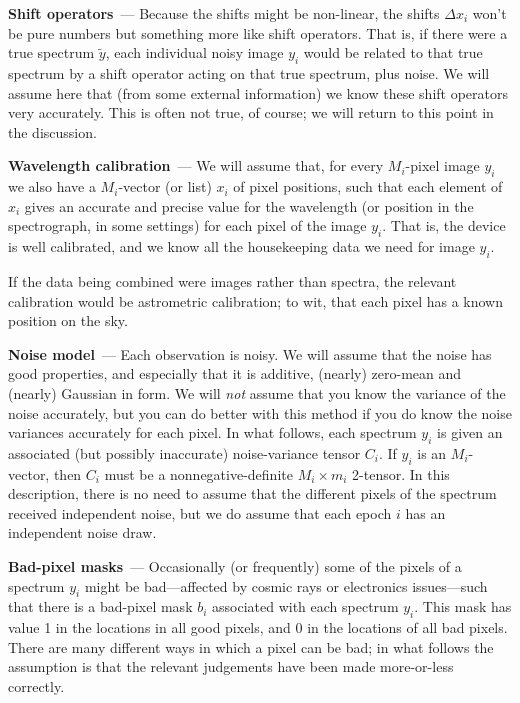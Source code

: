 \documentclass[modern]{aastex631}
\renewcommand{\paragraph}[1]{\medskip\par\noindent\textbf{#1}~---}
\begin{document}
\paragraph{Shift operators}
Because the shifts might be non-linear, the shifts $\Delta x_i$ won't be pure numbers but something more like shift operators.
That is, if there were a true spectrum $\tilde{y}$, each individual noisy image $y_i$ would be related to that true spectrum by a shift operator acting on that true spectrum, plus noise.
We will assume here that (from some external information) we know these shift operators very accurately.
This is often not true, of course; we will return to this point in the discussion.

\paragraph{Wavelength calibration}
We will assume that, for every $M_i$-pixel image $y_i$ we also have a $M_i$-vector (or list) $x_i$ of pixel positions, such that each element of $x_i$ gives an accurate and precise value for the wavelength (or position in the spectrograph, in some settings) for each pixel of the image $y_i$.
That is, the device is well calibrated, and we know all the housekeeping data we need for image $y_i$.

If the data being combined were images rather than spectra, the relevant calibration would be astrometric calibration; to wit, that each pixel has a known position on the sky.

\paragraph{Noise model}
Each observation is noisy.
We will assume that the noise has good properties, and especially that it is additive, (nearly) zero-mean and (nearly) Gaussian in form.
We will \emph{not} assume that you know the variance of the noise accurately, but you can do better with this method if you do know the noise variances accurately for each pixel.
In what follows, each spectrum $y_i$ is given an associated (but possibly inaccurate) noise-variance tensor $C_i$.
If $y_i$ is an $M_i$-vector, then $C_i$ must be a nonnegative-definite $M_i\times m_i$ 2-tensor.
In this description, there is no need to assume that the different pixels of the spectrum received independent noise, but we do assume that each epoch $i$ has an independent noise draw.

\paragraph{Bad-pixel masks}
Occasionally (or frequently) some of the pixels of a spectrum $y_i$ might be bad---affected by cosmic rays or electronics issues---such that there is a bad-pixel mask $b_i$ associated with each spectrum $y_i$.
This mask has value 1 in the locations in all good pixels, and 0 in the locations of all bad pixels.
There are many different ways in which a pixel can be bad; in what follows the assumption is that the relevant judgements have been made more-or-less correctly.
\end{document}
